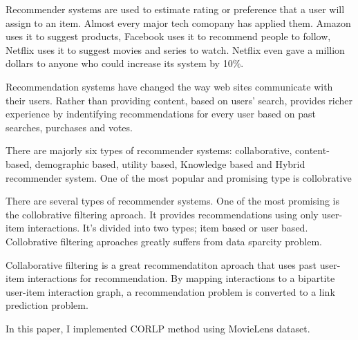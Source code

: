 Recommender systems are used to estimate rating or preference that a user will assign to an item. Almost every major tech comopany has applied them. Amazon uses it to suggest products, Facebook uses it to recommend people to follow, Netflix uses it to suggest movies and series to watch. Netflix even gave a million dollars to anyone who could increase its system by 10\%.

Recommendation systems have changed the way web sites communicate with their users. Rather than providing content, based on users' search, provides richer experience by indentifying recommendations for every user based on past searches, purchases and votes.

There are majorly six types of recommender systems: collaborative, content-based, demographic based, utility based, Knowledge based and Hybrid recommender system. One of the most popular and promising type is collobrative

There are several types of recommender systems. One of the most promising is the collobrative filtering aproach. It provides recommendations using only user-item interactions. It's divided into two types; item based or user based.~\cite{xie2015link} Collobrative filtering aproaches greatly suffers from data sparcity problem.~\cite{chen2005link}

Collaborative filtering is a great recommendatiton aproach  that uses past user-item interactions for recommendation. By mapping interactions to a bipartite user-item interaction graph, a recommendation problem is converted to a link prediction problem.~\cite{xie2015link}

In this paper, I implemented \ac{CORLP} method using MovieLens dataset.